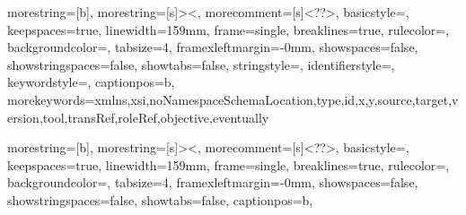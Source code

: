 {
  morestring=[b],
  morestring=[s]{>}{<},
  morecomment=[s]{<?}{?>},
  basicstyle=\ttfamily\small,
  keepspaces=true,                 
  linewidth=159mm,
  frame=single,  
  breaklines=true,
  rulecolor=\color{black!40},
  backgroundcolor=\color{gray!10},
  tabsize=4,
  framexleftmargin=-0mm,      
  showspaces=false,                
  showstringspaces=false,
  showtabs=false,     
  stringstyle=\color{black},
  identifierstyle=\color{darkblue},
  keywordstyle=\color{cyan},
  captionpos=b,
  morekeywords={xmlns,xsi,noNamespaceSchemaLocation,type,id,x,y,source,target,version,tool,transRef,roleRef,objective,eventually}
}

{
  morestring=[b],
  morestring=[s]{>}{<},
  morecomment=[s]{<?}{?>},
  basicstyle=\ttfamily\small,
  keepspaces=true,                 
  linewidth=159mm,
  frame=single,  
  breaklines=true,
  rulecolor=\color{white},
  backgroundcolor=\color{gray!10},
  tabsize=4,
  framexleftmargin=-0mm,      
  showspaces=false,                
  showstringspaces=false,
  showtabs=false,     
  captionpos=b,
}

\renewcommand{\lstlistingname}{Quellcode}
